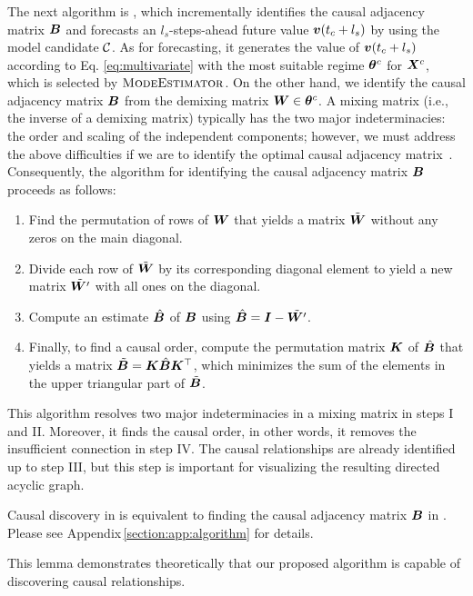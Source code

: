 \subsubsection{\modelgenerator}
\label{section:alg:generator}
The next algorithm is \modelgenerator,
which incrementally identifies the causal adjacency matrix $\bm{B}$ and
forecasts an $l_s$-steps-ahead future value $\bm{v}(t_c+l_s)$
by using the model candidate $\mathcal{C}$.
As for forecasting,
it generates the value of $\bm{v}(t_c+l_s)$ according to Eq. \eqref{eq:multivariate}
with the most suitable regime $\boldsymbol{\theta}^c$ for $\bm{X}^c$,
which is selected by $\textsc{ModeEstimator}$.
On the other hand,
we identify the causal adjacency matrix $\bm{B}$ from the demixing matrix $\bm{W} \in \boldsymbol{\theta}^c$.
A mixing matrix (i.e., the inverse of a demixing matrix) typically has the two major indeterminacies:
the order and scaling of the independent components;
however, we must address the above difficulties if we are to identify the optimal causal adjacency matrix~\cite{shimizu2006linear}.
Consequently, the algorithm for identifying the causal adjacency matrix $\bm{B}$ proceeds as follows:
{\setlength{\leftmargini}{15pt}
\begin{enumerate}
\renewcommand{\labelenumi}{\Roman{enumi}.}
\item Find the permutation of rows of $\bm{W}$ that yields a matrix $\tilde{\bm{W}}$ without any zeros on the main diagonal.
\item Divide each row of $\tilde{\bm{W}}$ by its corresponding diagonal element to yield a new matrix $\tilde{\bm{W}'}$ with all ones on the diagonal.
\item Compute an estimate $\hat{\bm{B}}$ of $\bm{B}$ using $\hat{\bm{B}} = \bm{I} - \tilde{\bm{W}'}$.
\item Finally, to find a causal order, compute the permutation matrix $\bm{K}$ of $\hat{\bm{B}}$ that yields a matrix $\tilde{\bm{B}} = \bm{K}\hat{\bm{B}}\bm{K}^\top$, which minimizes the sum of the elements in the upper triangular part of $\tilde{\bm{B}}$.
\end{enumerate}
}
\noindent This algorithm resolves two major indeterminacies in a mixing matrix in steps I and II.
Moreover, it finds the causal order, in other words, it removes the insufficient connection in step IV.
The causal relationships are already identified up to step III, but this step is important for visualizing the resulting directed acyclic graph.
\begin{lemma}
\label{lemma:causal}
Causal discovery in \method is equivalent to
finding the causal adjacency matrix $\bm{B}$ in \modelgenerator.
Please see Appendix\,\ref{section:app:algorithm} for details.
\end{lemma}
\noindent This lemma demonstrates theoretically that our proposed algorithm is capable of discovering causal relationships.
\par
